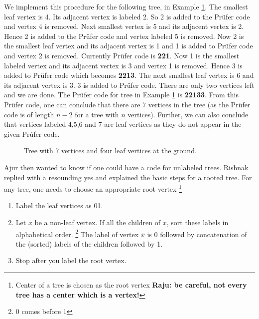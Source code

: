 We implement this procedure for the following tree, in Example \ref{8g5}. The smallest leaf vertex is 4. Its adjacent vertex is labeled 2. So 2 is added to the Pr{\"u}fer code and vertex 4 is removed. Next smallest vertex is 5 and its adjacent vertex is 2. Hence 2 is added to the Pr{\"u}fer code and vertex labeled 5 is removed. Now 2 is the smallest leaf vertex and its adjacent vertex is 1 and  1 is added to Pr{\"u}fer code and vertex 2 is removed. Currently Pr{\"u}fer code is \textbf{221}. Now 1 is the smallest labeled vertex and its adjacent vertex is 3 and vertex 1 is removed. Hence 3 is added to Pr{\"u}fer code which becomes \textbf{2213}. The next smallest leaf vertex is 6 and its adjacent vertex is 3. 3 is added to Pr{\"u}fer code. There are only two vertices left and we are done. The Pr{\"u}fer code for tree in Example \ref{8g5} is \textbf{22133}. From this Pr{\"u}fer code, one can conclude that there are 7 vertices in the tree (as the Pr{\"u}fer code is of length $n-2$ for a tree with $n$ vertices). Further, we can also conclude that vertices labeled 4,5,6 and 7 are leaf vertices as they do not appear in the given Pr{\'u}fer code. 
\begin{figure}
\begin{center}


\caption{Tree with 7 vertices and four leaf vertices at the ground. }\label{8g5}
\end{center}
\end{figure}

Ajur then wanted to know if one could have a code for unlabeled trees. Rishnak replied with a resounding yes and explained the basic steps for a rooted tree. For any tree, one needs to choose an appropriate root vertex \footnote{Center of a tree is chosen as the root vertex \textbf{Raju: be careful, not every tree has a center which is a vertex!}} 
\begin{enumerate}
    \item  Label the leaf vertices as 01.
    \item Let $x$ be a non-leaf vertex. If all the children of $x$, sort these labels in alphabetical order. \footnote{0 comes before 1} The label of vertex $x$ is 0 followed by concatenation of the (sorted) labels of the children followed by 1.
    \item Stop after you label the root vertex.
\end{enumerate}


